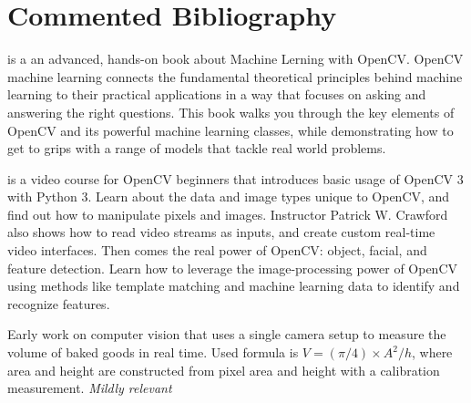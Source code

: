 \clearpage
\chapter*{Commented Bibliography}

\newcommand{\parstartcite}[1]{\textbf{\citeauthor{#1}} \textsf{\citetitle{#1}} \newline}

\parstartcite{beyeler2017opencvml} is a an advanced, hands-on book about Machine Lerning with OpenCV.
OpenCV machine learning connects the fundamental theoretical principles
behind machine learning to their practical applications in a way that focuses
on asking and answering the right questions.
This book walks you through the key elements of OpenCV
and its powerful machine learning classes,
while demonstrating how to get to grips with a range of models that tackle real world problems.


\parstartcite{crawford2017opencvpythonvideo} is a video course for OpenCV beginners that introduces basic usage of OpenCV 3 with Python 3. 
Learn about the data and image types unique to OpenCV, and find out how to
manipulate pixels and images. Instructor Patrick W. Crawford also shows how
to read video streams as inputs, and create custom real-time video interfaces.
Then comes the real power of OpenCV: object, facial, and feature detection.
Learn how to leverage the image-processing power of OpenCV using methods like
template matching and machine learning data to identify and recognize features.


\parstartcite{rusu2011pointcloud}

\parstartcite{levine1989microwave}
Early work on computer vision that uses a single camera setup to measure the volume of baked goods in real time. Used formula is $V = (\pi/4) \times A^2/h$, where area and height are constructed from pixel area and height with a calibration measurement.
\emph{Mildly relevant}

\parstartcite{wang2017apple}

\parstartcite{hildebrand1997thickness}

\parstartcite{vogiatzis2010stereo}

\parstartcite{taj2010detection}

\parstartcite{hartley2004multiview}

\parstartcite{bostondiditeam2017mv3d}

\parstartcite{chen2017mv3d}

